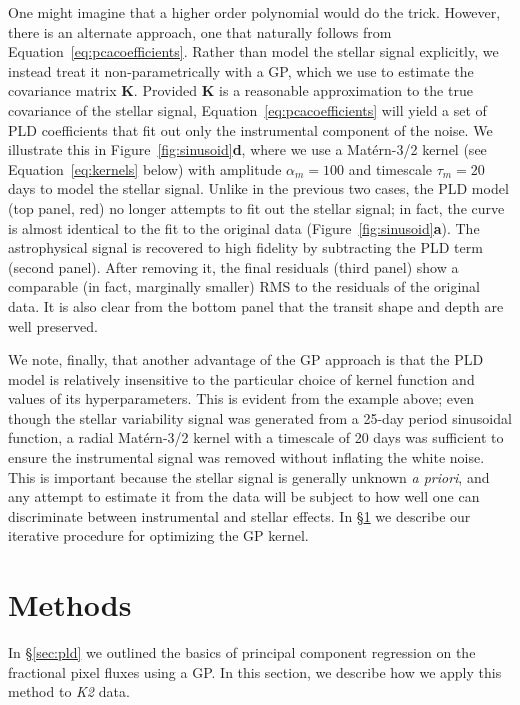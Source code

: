 \documentclass[]{emulateapj}
\begin{document}
One might imagine that a higher order polynomial would do the trick. However, there
is an alternate approach, one that naturally follows from Equation~\ref{eq:pcacoefficients}.
Rather than model the stellar signal explicitly, we instead treat it non-parametrically
with a GP, which we use to estimate the covariance matrix $\mathbf{K}$. Provided
$\mathbf{K}$ is a reasonable approximation to the true covariance of the stellar signal,
Equation~\ref{eq:pcacoefficients} will yield a set of PLD coefficients that 
fit out only the instrumental component of the noise. We illustrate this in 
Figure~\ref{fig:sinusoid}\textbf{d}, where we use a Mat\'ern-3/2 kernel 
(see Equation~\ref{eq:kernels} below) with amplitude $\alpha_m = 100$ and timescale
$\tau_m = 20$ days to model the stellar signal. Unlike in the previous two cases,
the PLD model (top panel, red) no longer attempts to fit out the stellar signal; in 
fact, the curve is almost identical to the fit to the original data 
(Figure~\ref{fig:sinusoid}\textbf{a}). The astrophysical signal is
recovered to high fidelity by subtracting the PLD term (second panel). After removing it,
the final residuals (third panel) show a comparable (in fact, marginally smaller) RMS to the
residuals of the original data. It is also clear from the bottom panel that the transit 
shape and depth are well preserved.

We note, finally, that another advantage of the GP approach is that the PLD model is
relatively insensitive to the particular choice of kernel function and values of its
hyperparameters. This is evident from the example above; even though the stellar
variability signal was generated from a 25-day period sinusoidal function, a radial
Mat\'ern-3/2 kernel with a timescale of 20 days was sufficient to ensure the instrumental
signal was removed without inflating the white noise. This is important because the
stellar signal is generally unknown \emph{a priori}, and any attempt to estimate it from the data
will be subject to how well one can discriminate between instrumental and stellar effects.
In \S\ref{sec:methods} we describe our iterative procedure for optimizing the GP kernel.

\section{Methods}
\label{sec:methods}
In \S\ref{sec:pld} we outlined the basics of principal component regression
on the fractional pixel fluxes using a GP. In this section, we describe how we apply
this method to \emph{K2} data.
\end{document}
